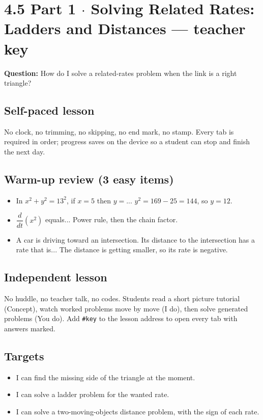 \documentclass[11pt]{article}
\begin{document}
\section*{4.5 Part 1 $\cdot$ Solving Related Rates: Ladders and Distances --- teacher key}
\textbf{Question:} How do I solve a related-rates problem when the link is a right triangle?\par
\subsection*{Self-paced lesson}No clock, no trimming, no skipping, no end mark, no stamp. Every tab is required in order; progress saves on the device so a student can stop and finish the next day.\par
\subsection*{Warm-up review (3 easy items)}\begin{itemize}
\item In $x^2+y^2=13^2$, if $x=5$ then $y=$...  $y^2=169-25=144$, so $y=12$.
\item $\dfrac{d}{dt}(x^2)$ equals...  Power rule, then the chain factor.
\item A car is driving toward an intersection. Its distance to the intersection has a rate that is...  The distance is getting smaller, so its rate is negative.
\end{itemize}
\subsection*{Independent lesson}No huddle, no teacher talk, no codes. Students read a short picture tutorial (Concept), watch worked problems move by move (I do), then solve generated problems (You do). Add \texttt{\#key} to the lesson address to open every tab with answers marked.\par
\subsection*{Targets}\begin{itemize}\item I can find the missing side of the triangle at the moment.
\item I can solve a ladder problem for the wanted rate.
\item I can solve a two-moving-objects distance problem, with the sign of each rate.\end{itemize}
\end{document}
